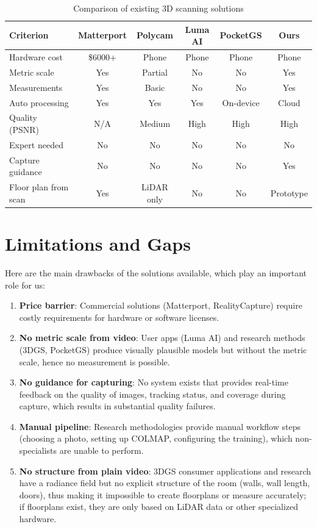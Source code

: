 \begin{table}[htbp]
\centering
\caption{Comparison of existing 3D scanning solutions}
\label{tab:comparison}
\begin{tabular}{p{2.8cm}ccccc}
\toprule
\textbf{Criterion} & \textbf{Matterport} & \textbf{Polycam} & \textbf{Luma AI} & \textbf{PocketGS} & \textbf{Ours} \\
\midrule
Hardware cost & \$6000+ & Phone & Phone & Phone & Phone \\
Metric scale & Yes & Partial & No & No & Yes \\
Measurements & Yes & Basic & No & No & Yes \\
Auto processing & Yes & Yes & Yes & On-device & Cloud \\
Quality (PSNR) & N/A & Medium & High & High & High \\
Expert needed & No & No & No & No & No \\
Capture guidance & No & No & No & No & Yes \\
Floor plan from scan & Yes & LiDAR only & No & No & Prototype \\
\bottomrule
\end{tabular}
\end{table}

\section{Limitations and Gaps}
\label{sec:gaps}
Here are the main drawbacks of the solutions available, which play an important role for us:
\begin{enumerate}
    \item \textbf{Price barrier}: Commercial solutions (Matterport, RealityCapture) require costly requirements for hardware or software licenses.
    \item \textbf{No metric scale from video}: User apps (Luma AI) and research methods (3DGS, PocketGS) produce visually plausible models but without the metric scale, hence no measurement is possible.
    \item \textbf{No guidance for capturing}: No system exists that provides real-time feedback on the quality of images, tracking status, and coverage during capture, which results in substantial quality failures.
    \item \textbf{Manual pipeline}: Research methodologies provide manual workflow steps (choosing a photo, setting up COLMAP, configuring the training), which non-specialists are unable to perform.
    \item \textbf{No structure from plain video}: 3DGS consumer applications and research have a radiance field but no explicit structure of the room (walls, wall length, doors), thus making it impossible to create floorplans or measure accurately; if floorplans exist, they are only based on LiDAR data or other specialized hardware.
\end{enumerate}

